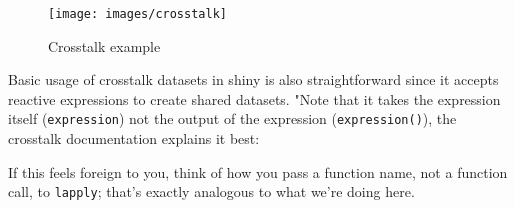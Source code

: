 \documentclass[
  10pt,
]{krantz}
\makeatletter
\newenvironment{Shaded}{\begin{snugshade}}{\end{snugshade}}
\newcommand{\DataTypeTok}[1]{\textcolor[rgb]{0.27,0.27,0.27}{#1}}
\newcommand{\KeywordTok}[1]{\textcolor[rgb]{0.27,0.27,0.27}{\textbf{#1}}}
\newcommand{\NormalTok}[1]{#1}
\newcommand{\OperatorTok}[1]{\textcolor[rgb]{0.43,0.43,0.43}{\textbf{#1}}}
\newcommand{\StringTok}[1]{\textcolor[rgb]{0.5,0.5,0.5}{#1}}
\renewenvironment{quote}{\begin{VF}}{\end{VF}}
\newenvironment{kframe}{%
\medskip{}
\setlength{\fboxsep}{.8em}
 \def\at@end@of@kframe{}%
 \ifinner\ifhmode%
  \def\at@end@of@kframe{\end{minipage}}%
  \begin{minipage}{\columnwidth}%
 \fi\fi%
 \def\FrameCommand##1{\hskip\@totalleftmargin \hskip-\fboxsep
 \colorbox{shadecolor}{##1}\hskip-\fboxsep
     \hskip-\linewidth \hskip-\@totalleftmargin \hskip\columnwidth}%
 \MakeFramed {\advance\hsize-\width
   \@totalleftmargin\z@ \linewidth\hsize
   \@setminipage}}%
 {\par\unskip\endMakeFramed%
 \at@end@of@kframe}
\renewenvironment{Shaded}{\begin{kframe}}{\end{kframe}}
\makeatother
\begin{document}
\begin{Shaded}
\end{Shaded}

\begin{figure}[H]

{\centering \texttt{[image: images/crosstalk]} 

}

\caption{Crosstalk example}\label{fig:crosstalk-1}
\end{figure}

Basic usage of crosstalk datasets in shiny is also straightforward since it accepts reactive expressions to create shared datasets. "Note that it takes the expression itself (\texttt{expression}) not the output of the expression (\texttt{expression()}), the crosstalk documentation explains it best:

\begin{quote}
If this feels foreign to you, think of how you pass a function name, not a function call, to \texttt{lapply}; that's exactly analogous to what we're doing here.

\end{quote}
\end{document}
